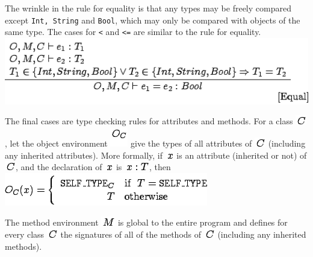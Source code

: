 \documentclass[]{article}
\begin{document}
The wrinkle in the rule for equality is that any types may be freely
compared except \texttt{Int, String} and \texttt{Bool}, which may only
be compared with objects of the same type. The cases for
\texttt{\textless{}} and \texttt{\textless{}=} are similar to the rule
for equality. \\

\includegraphics{img108.png}

The final cases are type checking rules for attributes and methods. For
a class \includegraphics{img61.png}, let the object environment
\includegraphics{img109.png} give the types of all attributes of
\includegraphics{img61.png} (including any inherited attributes). More
formally, if \includegraphics{img91.png} is an attribute (inherited or
not) of \includegraphics{img61.png}, and the declaration of
\includegraphics{img91.png} is \includegraphics{img110.png}, then \\

\includegraphics{img111.png}

The method environment \includegraphics{img55.png} is global to the
entire program and defines for every class \includegraphics{img61.png}
the signatures of all of the methods of \includegraphics{img61.png}
(including any inherited methods).
\end{document}
